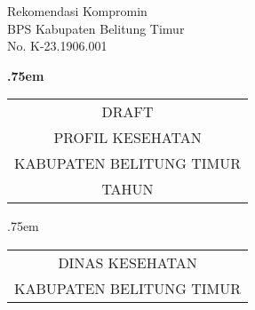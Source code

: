 \begin{titlepage}
    \begin{center}
        {\raggedleft Rekomendasi Kompromin\\BPS Kabupaten Belitung Timur\\No. K-23.1906.001
        
        }
        \vspace*{48ex}
            
        {\LARGE \bfseries
        	\lineskip .75em%
        	\begin{tabular}[t]{c}%
        		DRAFT\\PROFIL KESEHATAN\\KABUPATEN BELITUNG TIMUR\\TAHUN \tPnos{}
        	\end{tabular}\par}%
            
            
        \vspace{3ex}
        {\large
        	\lineskip .75em%
        	\begin{tabular}[t]{c}%
        		DINAS KESEHATAN\\KABUPATEN BELITUNG TIMUR
        	\end{tabular}\par}%
            
            
        \vspace{1.5ex}
    \end{center}
\end{titlepage}